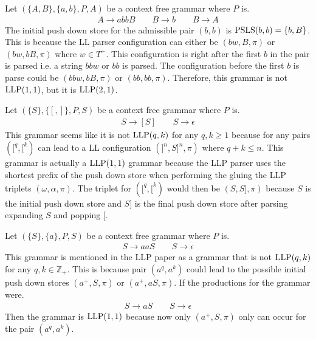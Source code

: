 \begin{example}
    Let $(\{A, B\}, \{a, b\}, P, A)$ be a context free grammar where $P$ is.
    \begin{gather*}
        A \to a b b B \qquad B \to b \qquad B \to A
    \end{gather*}
    The initial push down store for the admissible pair $(b, b)$ is $\text{PSLS}(b, b) = \{b, B\}$. This is because the LL parser configuration can either be $(bw, B, \pi)$ or $(bw, bB, \pi)$ where $w \in T^+$. This configuration is right after the first $b$ in the pair is parsed i.e. a string $bbw$ or $bb$ is parsed. The configuration before the first $b$ is parse could be $(bbw, bB, \pi)$ or $(bb, bb, \pi)$. Therefore, this grammar is not $\text{LLP}(1, 1)$, but it is $\text{LLP}(2, 1)$.
\end{example}

\begin{example}
    Let $(\{S\}, \{[, ]\}, P, S)$ be a context free grammar where $P$ is.
    \begin{gather*}
        S \to [S] \qquad S \to \epsilon
    \end{gather*}
    This grammar seems like it is not $\text{LLP}(q, k)$ for any $q, k \geq 1$ because for any pairs $([^q, [^k)$ can lead to a LL configuration $(]^n, S]^n, \pi)$ where $q + k \leq n$. This grammar is actually a $\text{LLP}(1,1)$ grammar because the LLP parser uses the shortest prefix of the push down store when performing the gluing the LLP triplets $(\omega, \alpha, \pi)$. The triplet for $([^q, [^k)$ would then be $(S, S], \pi)$ because $S$ is the initial push down store and $S]$ is the final push down store after parsing expanding $S$ and popping $[$.
\end{example}


\begin{example}
    Let $(\{S\}, \{a\}, P, S)$ be a context free grammar where $P$ is.
    \begin{gather*}
        S \to aaS \qquad S \to \epsilon
    \end{gather*}
    This grammar is mentioned in the LLP paper \cite[16]{Vagner2007} as a grammar that is not $\text{LLP}(q,k)$ for any $q, k \in \mathbb{Z}_+$. This is because pair $(a^q, a^k)$ could lead to the possible initial push down stores $(a^+, S, \pi)$ or $(a^+, aS, \pi)$. If the productions for the grammar were.
    \begin{gather*}
        S \to aS \qquad S \to \epsilon
    \end{gather*}
    Then the grammar is $\text{LLP}(1, 1)$ because now only $(a^+, S, \pi)$ only can occur for the pair $(a^q, a^k)$.
\end{example}